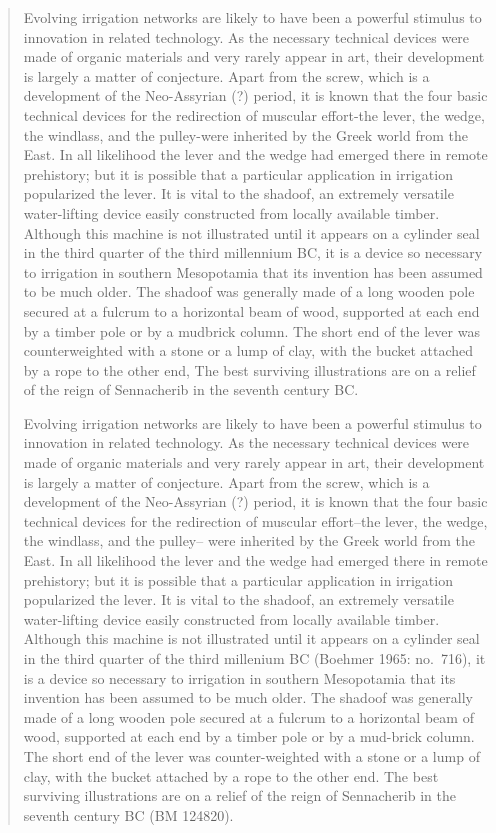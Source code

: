 \documentclass{article}
\begin{document}
\begin{quote}
Evolving irrigation networks are likely to have
been a powerful stimulus to innovation in related technology.
As the necessary technical devices were made
of organic materials and very rarely appear in art, their
development is largely a matter of conjecture. Apart
from the screw, which is a development of the Neo-Assyrian
(?) period, it is known that the four basic
technical devices for the redirection of muscular
effort-the lever, the wedge, the windlass, and the pulley-were
inherited by the Greek world from the East.
In all likelihood the lever and the
wedge had emerged there in remote prehistory; but
it is possible that a particular application in irrigation
popularized the lever. It is vital to the shadoof, an
extremely versatile water-lifting device easily constructed
from locally available timber.
Although this machine is not illustrated until it appears
on a cylinder seal in the third quarter of the third
millennium BC, it is a device
so necessary to irrigation in southern Mesopotamia that
its invention has been assumed to be much older. The
shadoof was generally made of a long wooden pole
secured at a fulcrum to a horizontal beam of wood,
supported at each end by a timber pole or by a mudbrick
column. The short end of the lever was counterweighted
with a stone or a lump of clay, with the bucket
attached by a rope to the other end, The best surviving
illustrations are on a relief of the reign of Sennacherib
in the seventh century BC.

Evolving irrigation networks are likely to have
been a powerful stimulus to innovation in related technology.
As the necessary technical devices were made 
of organic materials and very rarely appear in art, their
development is largely a matter of conjecture. Apart 
from the screw, which is a development of the Neo-Assyrian (?) period,
it is known that the four basic technical devices for the redirection of muscular
effort--the lever, the wedge, the windlass, and the pulley--
were inherited by the Greek world from the East. 
In all likelihood the lever and the
wedge had emerged there in remote prehistory; but
it is possible that a particular application in irrigation
popularized the lever. It is vital to the shadoof, an 
extremely versatile water-lifting device easily constructed
from locally available timber. Although this machine is not illustrated
until it appears on a cylinder seal in the third quarter of the third
millenium BC (Boehmer 1965: no.~716), it is a device
so necessary to irrigation in southern Mesopotamia that
its invention has been assumed to be much older. The
shadoof was generally made of a long wooden pole
secured at a fulcrum to a horizontal beam of wood,
supported at each end by a timber pole or by a 
mud-brick column. The short end of the lever was
counter-weighted with a stone or a lump of clay, with the bucket
attached by a rope to the other end. The best surviving
illustrations are on a relief of the reign of Sennacherib
in the seventh century BC (BM 124820).
\end{quote}
\end{document}
